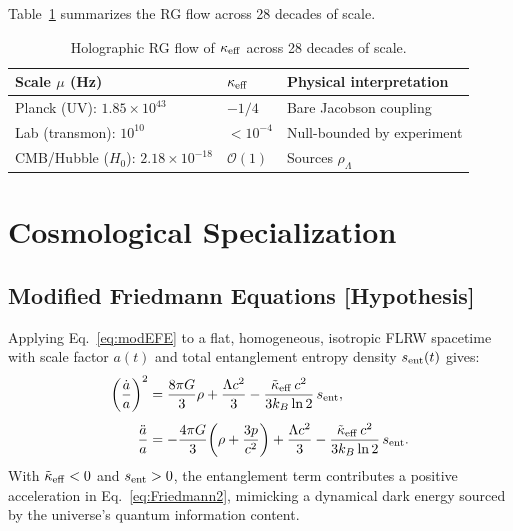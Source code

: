 \documentclass[12pt]{article}
\newcommand{\hypothesis}{\textbf{[Hypothesis]}}
\begin{document}
Table~\ref{tab:RG} summarizes the RG flow across 28 decades of scale.

\begin{table}[ht]
\centering
\caption{Holographic RG flow of $\kappa_{\rm eff}$ across 28 decades of scale.}
\label{tab:RG}
\begin{tabular}{lll}
\toprule
\textbf{Scale} $\mu$ (Hz) & $\kappa_{\rm eff}$ & \textbf{Physical interpretation}\\
\midrule
Planck (UV): $1.85\times 10^{43}$ & $-1/4$ & Bare Jacobson coupling\\
Lab (transmon): $10^{10}$ & $< 10^{-4}$ & Null-bounded by experiment\\
CMB/Hubble ($H_0$): $2.18\times 10^{-18}$ & $\mathcal{O}(1)$ & Sources $\rho_\Lambda$\\
\bottomrule
\end{tabular}
\end{table}

\section{Cosmological Specialization}
\label{sec:cosmology}

\subsection{Modified Friedmann Equations \hypothesis}

Applying Eq.~\eqref{eq:modEFE} to a flat, homogeneous, isotropic FLRW spacetime with
scale factor $a(t)$ and total entanglement entropy density $s_{\rm ent}(t)$ gives:
\begin{align}
\left(\frac{\dot{a}}{a}\right)^2
&= \frac{8\pi G}{3}\rho + \frac{\Lambda c^2}{3}
- \frac{\tilde{\kappa}_{\rm eff}\,c^2}{3k_B\ln 2}\,s_{\rm ent},
\label{eq:Friedmann1}\\[4pt]
\frac{\ddot{a}}{a}
&= -\frac{4\pi G}{3}\!\left(\rho + \frac{3p}{c^2}\right)
+ \frac{\Lambda c^2}{3}
- \frac{\tilde{\kappa}_{\rm eff}\,c^2}{3k_B\ln 2}\,s_{\rm ent}.
\label{eq:Friedmann2}
\end{align}
With $\tilde{\kappa}_{\rm eff} < 0$ and $s_{\rm ent} > 0$, the entanglement term
contributes a positive acceleration in Eq.~\eqref{eq:Friedmann2}, mimicking a dynamical
dark energy sourced by the universe's quantum information content.

\end{document}
